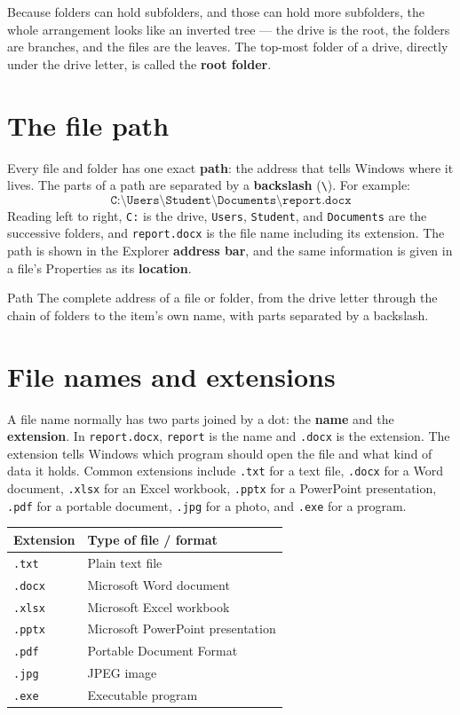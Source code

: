 Because folders can hold subfolders, and those can hold more subfolders, the
whole arrangement looks like an inverted tree --- the drive is the root, the
folders are branches, and the files are the leaves. The top-most folder of a
drive, directly under the drive letter, is called the \textbf{root folder}.

\section{The file path}
Every file and folder has one exact \textbf{path}: the address that tells
Windows where it lives. The parts of a path are separated by a
\textbf{backslash} (\verb|\|). For example:
\[
\texttt{C:\textbackslash Users\textbackslash Student\textbackslash
Documents\textbackslash report.docx}
\]
Reading left to right, \texttt{C:} is the drive, \texttt{Users},
\texttt{Student}, and \texttt{Documents} are the successive folders, and
\texttt{report.docx} is the file name including its extension. The path is
shown in the Explorer \textbf{address bar}, and the same information is given
in a file's Properties as its \textbf{location}.

\begin{definitionbox}{Path}
The complete address of a file or folder, from the drive letter through the
chain of folders to the item's own name, with parts separated by a backslash.
\end{definitionbox}

\section{File names and extensions}
A file name normally has two parts joined by a dot: the \textbf{name} and the
\textbf{extension}. In \texttt{report.docx}, \texttt{report} is the name and
\texttt{.docx} is the extension. The extension tells Windows which program
should open the file and what kind of data it holds. Common extensions
include \texttt{.txt} for a text file, \texttt{.docx} for a Word document,
\texttt{.xlsx} for an Excel workbook, \texttt{.pptx} for a PowerPoint
presentation, \texttt{.pdf} for a portable document, \texttt{.jpg} for a
photo, and \texttt{.exe} for a program.

\begin{center}
\begin{tabular}{p{}p{}}
\toprule
\textbf{Extension} & \textbf{Type of file / format} \\
\midrule
\texttt{.txt} & Plain text file \\
\texttt{.docx} & Microsoft Word document \\
\texttt{.xlsx} & Microsoft Excel workbook \\
\texttt{.pptx} & Microsoft PowerPoint presentation \\
\texttt{.pdf} & Portable Document Format \\
\texttt{.jpg} & JPEG image \\
\texttt{.exe} & Executable program \\
\bottomrule
\end{tabular}
\end{center}


